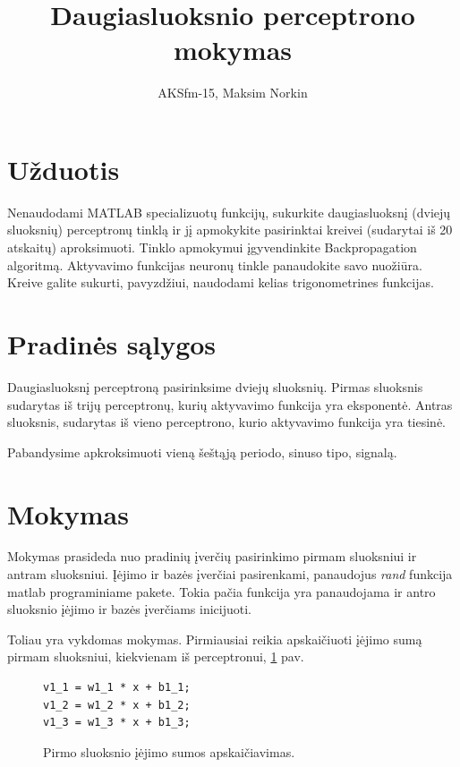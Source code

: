 \documentclass[11pt, a4paper, lithuanian]{article}
\author{AKSfm-15, Maksim Norkin}
\title{Daugiasluoksnio perceptrono mokymas}
\begin{document}
    \maketitle

    \section{Užduotis}

    Nenaudodami MATLAB specializuotų funkcijų, sukurkite daugiasluoksnį (dviejų sluoksnių) perceptronų tinklą ir jį apmokykite pasirinktai kreivei (sudarytai iš 20 atskaitų) aproksimuoti. Tinklo apmokymui įgyvendinkite Backpropagation algoritmą. Aktyvavimo funkcijas neuronų tinkle panaudokite savo nuožiūra. Kreive galite sukurti, pavyzdžiui, naudodami kelias trigonometrines funkcijas.

    \section{Pradinės sąlygos}

    Daugiasluoksnį perceptroną pasirinksime dviejų sluoksnių. Pirmas sluoksnis sudarytas iš trijų perceptronų, kurių aktyvavimo funkcija yra eksponentė. Antras sluoksnis, sudarytas iš vieno perceptrono, kurio aktyvavimo funkcija yra tiesinė.

    Pabandysime apkroksimuoti vieną šeštąją periodo, sinuso tipo, signalą.

    \section{Mokymas}

    Mokymas prasideda nuo pradinių įverčių pasirinkimo pirmam sluoksniui ir antram sluoksniui. Įėjimo ir bazės įverčiai pasirenkami, panaudojus \textit{rand} funkcija matlab programiniame pakete. Tokia pačia funkcija yra panaudojama ir antro sluoksnio įėjimo ir bazės įverčiams inicijuoti.

    Toliau yra vykdomas mokymas. Pirmiausiai reikia apskaičiuoti įėjimo sumą pirmam sluoksniui, kiekvienam iš perceptronui, \ref{code:pirmo_sluoksnio_iejimo_funkcijos_apskaiciavimas} pav.

    \begin{figure}[h]
      \centering
      \caption{Pirmo sluoksnio įėjimo sumos apskaičiavimas.}
      \label{code:pirmo_sluoksnio_iejimo_funkcijos_apskaiciavimas}
      \begin{lstlisting}
v1_1 = w1_1 * x + b1_1;
v1_2 = w1_2 * x + b1_2;
v1_3 = w1_3 * x + b1_3;
      \end{lstlisting}
    \end{figure}
\end{document}
